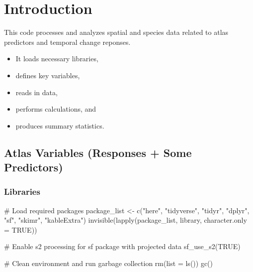 \documentclass[
  letterpaper,
  DIV=11,
  numbers=noendperiod]{scrreprt}
\newenvironment{Shaded}{\begin{snugshade}}{\end{snugshade}}
\newcommand{\AttributeTok}[1]{\textcolor[rgb]{0.40,0.45,0.13}{#1}}
\newcommand{\CommentTok}[1]{\textcolor[rgb]{0.37,0.37,0.37}{#1}}
\newcommand{\ConstantTok}[1]{\textcolor[rgb]{0.56,0.35,0.01}{#1}}
\newcommand{\FunctionTok}[1]{\textcolor[rgb]{0.28,0.35,0.67}{#1}}
\newcommand{\NormalTok}[1]{\textcolor[rgb]{0.00,0.23,0.31}{#1}}
\newcommand{\OtherTok}[1]{\textcolor[rgb]{0.00,0.23,0.31}{#1}}
\newcommand{\StringTok}[1]{\textcolor[rgb]{0.13,0.47,0.30}{#1}}
\providecommand{\tightlist}{%
  \setlength{\itemsep}{0pt}\setlength{\parskip}{0pt}}\usepackage{longtable,booktabs,array}
\begin{document}
\hypertarget{introduction}{%
\chapter{Introduction}\label{introduction}}

This code processes and analyzes spatial and species data related to
atlas predictors and temporal change reponses.

\begin{itemize}
\tightlist
\item
  It loads necessary libraries,
\item
  defines key variables,
\item
  reads in data,
\item
  performs calculations, and
\item
  produces summary statistics.
\end{itemize}

\hypertarget{atlas-variables-responses-some-predictors}{%
\section{Atlas Variables (Responses + Some
Predictors)}\label{atlas-variables-responses-some-predictors}}

\hypertarget{libraries-1}{%
\subsection{Libraries}\label{libraries-1}}

\begin{Shaded}
\begin{Highlighting}[]
\CommentTok{\# Load required packages}
\NormalTok{package\_list }\OtherTok{\textless{}{-}} \FunctionTok{c}\NormalTok{(}\StringTok{"here"}\NormalTok{, }\StringTok{"tidyverse"}\NormalTok{, }\StringTok{"tidyr"}\NormalTok{, }\StringTok{"dplyr"}\NormalTok{, }\StringTok{"sf"}\NormalTok{, }\StringTok{"skimr"}\NormalTok{, }\StringTok{"kableExtra"}\NormalTok{)}
\FunctionTok{invisible}\NormalTok{(}\FunctionTok{lapply}\NormalTok{(package\_list, library, }\AttributeTok{character.only =} \ConstantTok{TRUE}\NormalTok{))}

\CommentTok{\# Enable s2 processing for sf package with projected data}
\FunctionTok{sf\_use\_s2}\NormalTok{(}\ConstantTok{TRUE}\NormalTok{)}

\CommentTok{\# Clean environment and run garbage collection}
\FunctionTok{rm}\NormalTok{(}\AttributeTok{list =} \FunctionTok{ls}\NormalTok{())}
\FunctionTok{gc}\NormalTok{()}
\end{Highlighting}
\end{Shaded}
\end{document}
